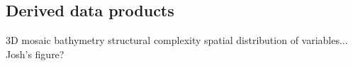 \subsection{Derived data products}
3D mosaic
bathymetry
structural complexity
spatial distribution of variables... Josh's figure?